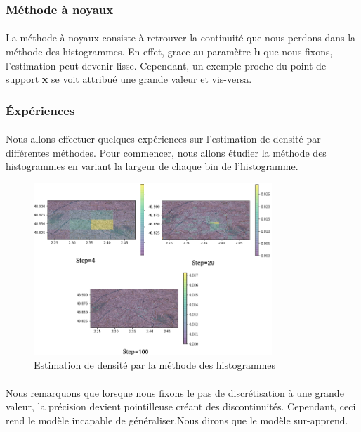 \documentclass{article}
\begin{document}
\subsubsection{Méthode à noyaux}
\paragraph{}
La méthode à noyaux consiste à retrouver la continuité que nous perdons dans la méthode des histogrammes. En effet, grace au paramètre \textbf{h} que nous fixons, l'estimation peut devenir lisse. Cependant, un exemple proche du point de support \textbf{x} se voit attribué une grande valeur et vis-versa. 
\subsubsection{Éxpériences}
\paragraph{}
Nous allons effectuer quelques expériences sur l'estimation de densité par différentes méthodes. Pour commencer, nous allons étudier la méthode des histogrammes en variant la largeur de chaque bin de l'histogramme.

\begin{figure}[H]
	\begin{center}
		\includegraphics[width=0.8\textwidth]{histo.png}
		\caption{Estimation de densité par la méthode des histogrammes }
	\end{center}
\end{figure}
\paragraph{}
Nous remarquons que lorsque nous fixons le pas de discrétisation à une grande valeur, la précision devient pointilleuse créant des discontinuités. Cependant, ceci rend le modèle incapable de généraliser.Nous dirons que le modèle sur-apprend.
\end{document}
